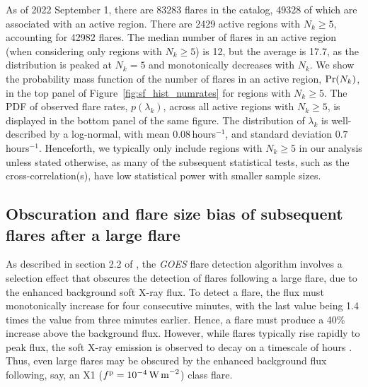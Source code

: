 As of 2022 September 1, there are 83283 flares in the catalog, 49328 of which are associated with an active region. There are 2429 active regions with $N_k\geq 5$, accounting for 42982 flares. The median number of flares in an active region (when considering only regions with $N_k \geq 5$) is 12, but the average is 17.7, as the distribution is peaked at $N_k = 5$ and monotonically decreases with $N_k$. We show the probability mass function of the number of flares in an active region, ${\rm Pr}(N_k)$, in the top panel of Figure~\ref{fig:sf_hist_numrates} for regions with $N_k \geq 5$. The PDF of observed flare rates, $p(\lambda_k)$, across all active regions with $N_k \geq 5$, is displayed in the bottom panel of the same figure. The distribution of $\lambda_k$ is well-described by a log-normal, with mean $0.08\,$hours$^{-1}$, and standard deviation $0.7\,$hours$^{-1}$. Henceforth, we typically only include regions with $N_k \geq 5$ in our analysis unless stated otherwise, as many of the subsequent statistical tests, such as the cross-correlation(s), have low statistical power with smaller sample sizes.

\subsection{Obscuration and flare size bias of subsequent flares after a large flare} \label{sec:sf_obscuration}
As described in section 2.2 of \citet{Wheatland2001}, the \emph{GOES} flare detection algorithm involves a selection effect that obscures the detection of flares following a large flare, due to the enhanced background soft X-ray flux. To detect a flare, the flux must monotonically increase for four consecutive minutes, with the last value being 1.4 times the value from three minutes earlier. Hence, a flare must produce a 40\% increase above the background flux. However, while flares typically rise rapidly to peak flux, the soft X-ray emission is observed to decay on a timescale of hours \citep{Benz2016}. Thus, even large flares may be obscured by the enhanced background flux following, say, an X1 ($f^{\rm p} = 10^{-4}\textrm{\,W\,m}^{-2}$) class flare. 

